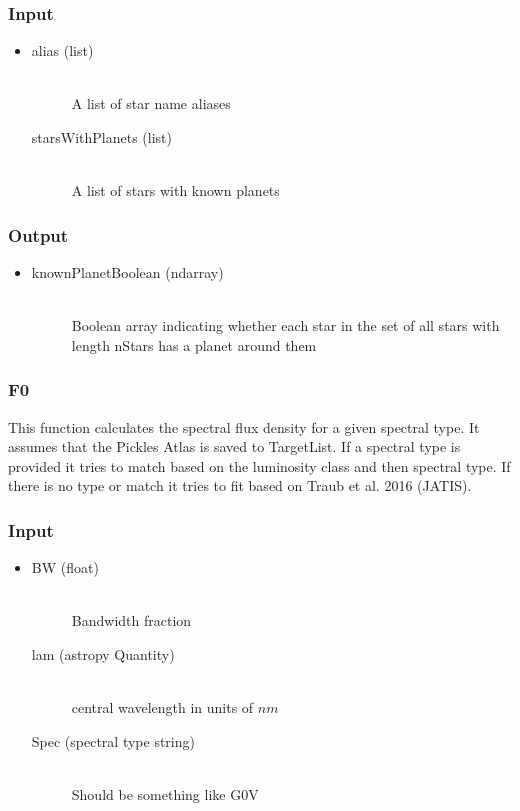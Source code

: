 \documentclass[cleanfoot]{asme2ej}
\begin{document}
\subsubsection*{Input}
\begin{itemize}
\item 
\begin{description}
    \item[alias (list)] \hfill \\ A list of star name aliases
    \item[starsWithPlanets (list)] \hfill \\ A list of stars with known planets
\end{description}
\end{itemize}
\subsubsection*{Output}
\begin{itemize}
\item
\begin{description}
    \item[knownPlanetBoolean (ndarray)] \hfill \\ Boolean array indicating whether each star in the set of all stars with length nStars has a planet around them
\end{description}
\end{itemize}

\subsubsection{F0} \label{sec:F0}
This function calculates the spectral flux density for a given spectral type. It assumes that the Pickles Atlas is saved to TargetList. If a spectral type is provided it tries to match based on the luminosity class and then spectral type. If there is no type or match it tries to fit based on Traub et al. 2016 (JATIS).
\subsubsection*{Input}
\begin{itemize}
\item 
\begin{description}
    \item[BW (float)] \hfill \\ Bandwidth fraction
    \item[lam (astropy Quantity)] \hfill \\ central wavelength in units of $nm$
    \item[Spec (spectral type string)] \hfill \\ Should be something like G0V
\end{description}
\end{itemize}
\end{document}
